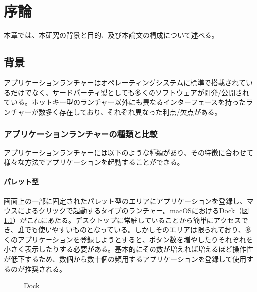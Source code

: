 \chapter{序論}
\label{chap:introduction}

本章では、本研究の背景と目的、及び本論文の構成について述べる。

\newpage

\section{背景}

アプリケーションランチャーはオペレーティングシステムに標準で搭載されているだけでなく、サードパーティ製としても多くのソフトウェアが開発/公開されている。ホットキー型のランチャー以外にも異なるインターフェースを持ったランチャーが数多く存在しており、それぞれ異なった利点/欠点がある。

\subsection{アプリケーションランチャーの種類と比較}

アプリケーションランチャーには以下のような種類があり、その特徴に合わせて様々な方法でアプリケーションを起動することができる。

\subsubsection{パレット型}

画面上の一部に固定されたパレット型のエリアにアプリケーションを登録し、マウスによるクリックで起動するタイプのランチャー。macOSにおけるDock（図\ref{fig:dock}）がこれにあたる。デスクトップに常駐していることから簡単にアクセスでき、誰でも使いやすいものとなっている。しかしそのエリアは限られており、多くのアプリケーションを登録しようとすると、ボタン数を増やしたりそれぞれを小さく表示したりする必要がある。基本的にその数が増えれば増えるほど操作性が低下するため、数個から数十個の頻用するアプリケーションを登録して使用するのが推奨される。

\begin{figure}[h]
    \begin{center}
    \end{center}
    \caption{Dock}
    \label{fig:dock}
\end{figure}

